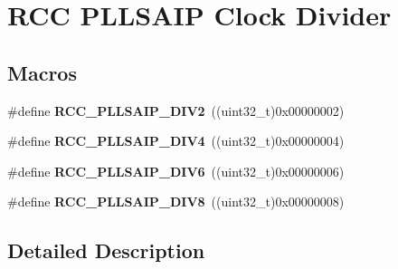 \hypertarget{group___r_c_c_ex___p_l_l_s_a_i_p___clock___divider}{}\section{R\+CC P\+L\+L\+S\+A\+IP Clock Divider}
\label{group___r_c_c_ex___p_l_l_s_a_i_p___clock___divider}
\subsection*{Macros}
\begin{DoxyCompactItemize}
\item 
\#define {\bfseries R\+C\+C\+\_\+\+P\+L\+L\+S\+A\+I\+P\+\_\+\+D\+I\+V2}~((uint32\+\_\+t)0x00000002)\hypertarget{group___r_c_c_ex___p_l_l_s_a_i_p___clock___divider_gaf32bded5c13110387b977fb25024d4cf}{}\label{group___r_c_c_ex___p_l_l_s_a_i_p___clock___divider_gaf32bded5c13110387b977fb25024d4cf}

\item 
\#define {\bfseries R\+C\+C\+\_\+\+P\+L\+L\+S\+A\+I\+P\+\_\+\+D\+I\+V4}~((uint32\+\_\+t)0x00000004)\hypertarget{group___r_c_c_ex___p_l_l_s_a_i_p___clock___divider_ga176e48faeb322f27e6b9da22c8e2df1f}{}\label{group___r_c_c_ex___p_l_l_s_a_i_p___clock___divider_ga176e48faeb322f27e6b9da22c8e2df1f}

\item 
\#define {\bfseries R\+C\+C\+\_\+\+P\+L\+L\+S\+A\+I\+P\+\_\+\+D\+I\+V6}~((uint32\+\_\+t)0x00000006)\hypertarget{group___r_c_c_ex___p_l_l_s_a_i_p___clock___divider_ga4387724f1e8b5a239b0de3ad3f9beb38}{}\label{group___r_c_c_ex___p_l_l_s_a_i_p___clock___divider_ga4387724f1e8b5a239b0de3ad3f9beb38}

\item 
\#define {\bfseries R\+C\+C\+\_\+\+P\+L\+L\+S\+A\+I\+P\+\_\+\+D\+I\+V8}~((uint32\+\_\+t)0x00000008)\hypertarget{group___r_c_c_ex___p_l_l_s_a_i_p___clock___divider_ga77e54744760b65a5422868294e45f302}{}\label{group___r_c_c_ex___p_l_l_s_a_i_p___clock___divider_ga77e54744760b65a5422868294e45f302}

\end{DoxyCompactItemize}


\subsection{Detailed Description}
